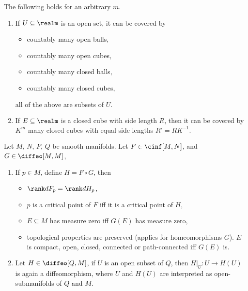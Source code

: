 \documentclass[../main-v2-manifolds.tex]{subfiles}
\begin{document}
\begin{lemma}\label{lee-covering-lemmas}
    The following holds for an arbitrary $m$.
    \begin{enumerate}
        \item If $U\subseteq\realm$ is an open set, it can be covered by
        \begin{itemize}
            \item countably many open balls, 
            \item countably many open cubes,
            \item countably many closed balls,
            \item countably many closed cubes,
        \end{itemize}
        all of the above are subsets of $U$.
        \item If $E\subseteq\realm$ is a closed cube with side length $R$, then it can be covered by $K^m$ many closed cubes with equal side lengths $R'=RK^{-1}$.
    \end{enumerate}
\end{lemma}

\begin{lemma}\label{lee-diffeomorphisms-invariance}
    Let $M$, $N$, $P$, $Q$ be smooth manifolds. Let $F\in\cinf[M,N]$, and $G\in\diffeo[M,M]$,
    \begin{enumerate}
        \item If $p\in M$, define $H = F\circ G$, then
        \begin{itemize}
            \item $\rank dF_p = \rank dH_p$,
            \item $p$ is a critical point of $F$ iff it is a critical point of $H$,
            \item $E\subseteq M$ has measure zero iff $G(E)$ has measure zero,
            \item topological properties are preserved (applies for homeomorphisms $G$). $E$ is compact, open, closed, connected or path-connected iff $G(E)$ is.
        \end{itemize}
        \item Let $H\in\diffeo[Q,M]$, if $U$ is an open subset of $Q$, then $H|_{U}:U\to H(U)$ is again a diffeomorphism, where $U$ and $H(U)$ are interpreted as open-submanifolds of $Q$ and $M$.
    \end{enumerate}
\end{lemma}
\end{document}
